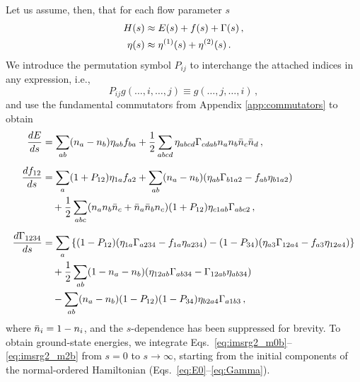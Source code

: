 Let us assume, then, that for each flow parameter $s$
\begin{align}
  H(s) &\approx E(s) + f(s) + \Gamma(s)\,,\\
  \eta(s) &\approx\eta^{(1)}(s)+\eta^{(2)}(s)\,.
\end{align}
We introduce the permutation symbol $P_{ij}$ to interchange the attached indices in any expression, i.e.,
\begin{equation}\label{eq:def_Pij}
  P_{ij} g(\ldots,i,\ldots,j) \equiv g(\ldots,j,\ldots,i)\,,
\end{equation}
and use the fundamental commutators from Appendix \ref{app:commutators} to obtain
\begin{align}
  \totd{E}{s}&= \sum_{ab}(n_a-n_b)\eta_{ab} f_{ba} 
    + \frac{1}{2} \sum_{abcd}\eta_{abcd}\Gamma_{cdab} n_a n_b\bar{n}_c\bar{n}_d
    \label{eq:imsrg2_m0b}\,,\\[5pt]
% 
  \totd{f_{12}}{s} &= 
  \sum_{a}(1+P_{12})\eta_{1a}f_{a2} +\sum_{ab}(n_a-n_b)(\eta_{ab}\Gamma_{b1a2}-f_{ab}\eta_{b1a2}) \notag\\ 
  &\quad +\frac{1}{2}\sum_{abc}(n_an_b\bar{n}_c+\bar{n}_a\bar{n}_bn_c) (1+P_{12})\eta_{c1ab}\Gamma_{abc2}
  \label{eq:imsrg2_m1b}\,,\\[5pt]
% 
  \totd{\Gamma_{1234}}{s}&= 
  \sum_{a}\left\{ 
    (1-P_{12})(\eta_{1a}\Gamma_{a234}-f_{1a}\eta_{a234} )
    -(1-P_{34})(\eta_{a3}\Gamma_{12a4}-f_{a3}\eta_{12a4} )
    \right\}\notag \\
  &\quad+ \frac{1}{2}\sum_{ab}(1-n_a-n_b)(\eta_{12ab}\Gamma_{ab34}-\Gamma_{12ab}\eta_{ab34})
    \notag\\
  &\quad-\sum_{ab}(n_a-n_b) (1-P_{12})(1-P_{34})\eta_{b2a4}\Gamma_{a1b3}
    \label{eq:imsrg2_m2b}\,,
\end{align}
where $\bar{n}_i=1-n_i$, and the $s$-dependence has been suppressed for brevity. To obtain ground-state energies, we integrate Eqs.~\eqref{eq:imsrg2_m0b}--\eqref{eq:imsrg2_m2b} from $s=0$ to $s\to\infty$, starting from the initial 
components of the normal-ordered Hamiltonian (Eqs.~\eqref{eq:E0}--\eqref{eq:Gamma}).

